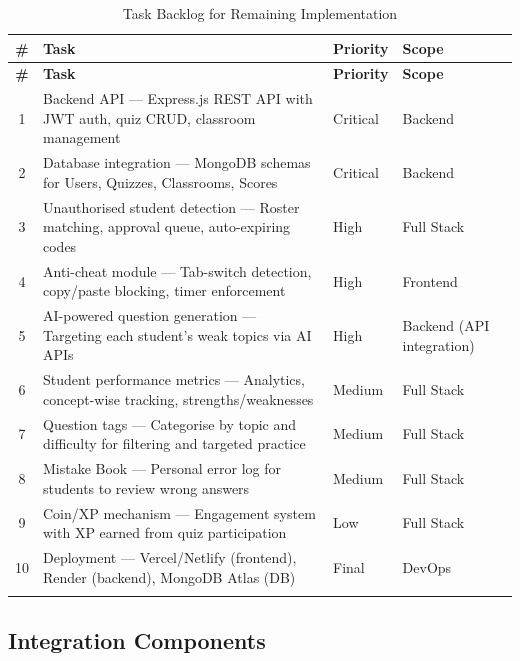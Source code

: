\documentclass[12pt,a4paper]{article}
\begin{document}
\begin{longtable}{@{} c p{4.5cm} l p{4cm} @{}}
  \toprule
  \textbf{\#} & \textbf{Task} & \textbf{Priority} & \textbf{Scope} \\
  \midrule
  \endfirsthead
  \toprule
  \textbf{\#} & \textbf{Task} & \textbf{Priority} & \textbf{Scope} \\
  \midrule
  \endhead
  1 & Backend API --- Express.js REST API with JWT auth, quiz CRUD, classroom management & Critical & Backend \\
  2 & Database integration --- MongoDB schemas for Users, Quizzes, Classrooms, Scores & Critical & Backend \\
  3 & Unauthorised student detection --- Roster matching, approval queue, auto-expiring codes & High & Full Stack \\
  4 & Anti-cheat module --- Tab-switch detection, copy/paste blocking, timer enforcement & High & Frontend \\
  5 & AI-powered question generation --- Targeting each student's weak topics via AI APIs & High & Backend (API integration) \\
  6 & Student performance metrics --- Analytics, concept-wise tracking, strengths/weaknesses & Medium & Full Stack \\
  7 & Question tags --- Categorise by topic and difficulty for filtering and targeted practice & Medium & Full Stack \\
  8 & Mistake Book --- Personal error log for students to review wrong answers & Medium & Full Stack \\
  9 & Coin/XP mechanism --- Engagement system with XP earned from quiz participation & Low & Full Stack \\
  10 & Deployment --- Vercel/Netlify (frontend), Render (backend), MongoDB Atlas (DB) & Final & DevOps \\
  \bottomrule
  \caption{Task Backlog for Remaining Implementation}
\end{longtable}

\subsection{Integration Components}
\end{document}
